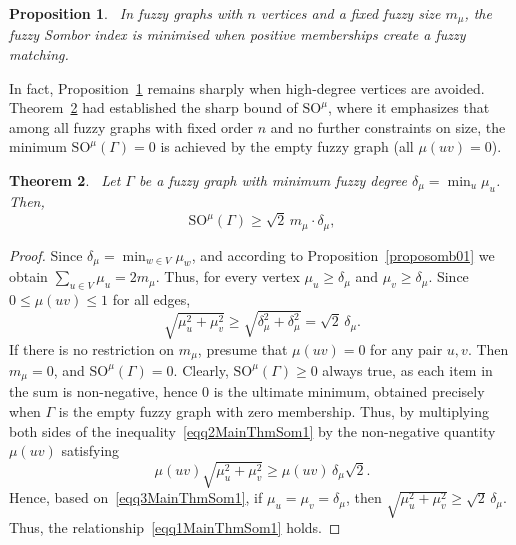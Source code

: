 \documentclass[12pt]{amsart}
\newtheorem{theorem}{Theorem}[section]
\newtheorem{proposition}[theorem]{Proposition}
\newcommand{\SOG}{\mathrm{SO}^{\mu}}
\begin{document}
\begin{proposition}~\label{MainPro001}
In fuzzy graphs with $n$ vertices and a fixed fuzzy size $m_{\mu}$, the fuzzy Sombor index is minimised when positive memberships create a fuzzy matching. 
\end{proposition}

In fact, Proposition~\ref{MainPro001} remains sharply when high-degree vertices are avoided. 
Theorem~\ref{MainThmSom1} had established the sharp bound of $\SOG$, where it emphasizes that among all fuzzy graphs with fixed order $n$ and no further constraints on size, the minimum $\SOG(\Gamma) = 0$ is achieved by the empty fuzzy graph (all $\mu(uv)=0$).

\begin{theorem}~\label{MainThmSom1}
Let $\Gamma$ be a fuzzy graph with minimum fuzzy degree   $\delta_{\mu} = \min_u \mu_u$. Then, 
\begin{equation}~\label{eqq1MainThmSom1}
\SOG(\Gamma) \geqslant \sqrt{2} \, m_{\mu} \cdot \delta_{\mu},
\end{equation}
\end{theorem}
\begin{proof}
Since $\delta_\mu=\min_{w\in V}\mu_w$, and according to Proposition~\ref{proposomb01} we obtain $\sum_{u \in V} \mu_u = 2 m_{\mu}.$ Thus, for every vertex $\mu_u\geqslant \delta_\mu$ and $\mu_v\ge \delta_\mu$. Since $0\leqslant \mu(uv)\leqslant 1$ for all edges, 
\begin{equation}~\label{eqq2MainThmSom1}
\sqrt{\mu_u^2+\mu_v^2}\geqslant \sqrt{\delta_\mu^2+\delta_\mu^2}
= \sqrt{2}\,\delta_\mu.
\end{equation}
If there is no restriction on $m_\mu$, presume that $\mu(uv)=0$ for any pair $u,v$. Then $m_\mu=0$, and $\SOG(\Gamma)=0$. Clearly, $\SOG(\Gamma)\ge 0$ always true, as each item in the sum is non-negative, hence $0$ is the ultimate minimum, obtained precisely when $\Gamma$ is the empty fuzzy graph with zero membership. 
Thus, by multiplying both sides of the inequality~\eqref{eqq2MainThmSom1} by the non-negative quantity $\mu(uv)$ satisfying 
\begin{equation}~\label{eqq3MainThmSom1}
\mu(uv)\sqrt{\mu_u^2+\mu_v^2}\geqslant \mu(uv)\,\delta_\mu\sqrt{2}. 
\end{equation}
Hence, based on~\eqref{eqq3MainThmSom1}, if $\mu_u=\mu_v=\delta_\mu$, then  $\sqrt{\mu_u^2+\mu_v^2}\geqslant \sqrt{2}\,\delta_\mu$. Thus, the relationship~\eqref{eqq1MainThmSom1} holds. 
\end{proof}
\end{document}
